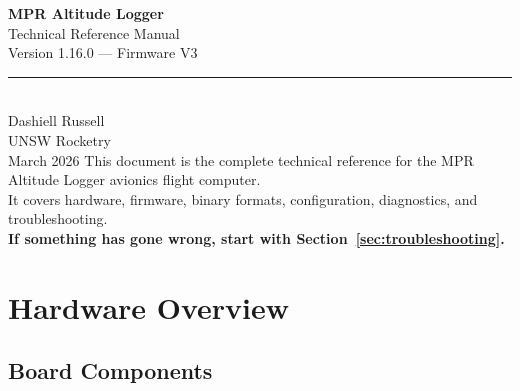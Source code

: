 \documentclass[11pt, a4paper, twoside]{article}
\begin{document}
\begin{titlepage}
\centering
\vspace*{4cm}
{\Huge\bfseries MPR Altitude Logger\\[0.3em]}
{\LARGE Technical Reference Manual\\[2em]}
{\Large Version 1.16.0 --- Firmware V3\\[1em]}
\rule{\textwidth}{0.8pt}\\[2em]
{\large Dashiell Russell\\UNSW Rocketry\\[1em]}
{\normalsize March 2026}
\vfill
{\small
This document is the complete technical reference for the MPR Altitude Logger avionics flight computer.\\
It covers hardware, firmware, binary formats, configuration, diagnostics, and troubleshooting.\\[0.5em]
\textbf{If something has gone wrong, start with Section~\ref{sec:troubleshooting}.}
}
\end{titlepage}

\tableofcontents
\newpage

\section{Hardware Overview}
\label{sec:hardware}

\subsection{Board Components}
\label{sec:board-components}
\end{document}
